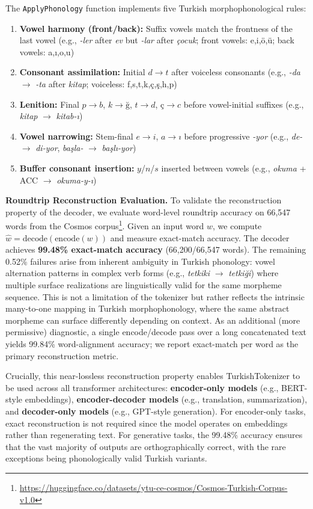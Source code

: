 The \texttt{ApplyPhonology} function implements five Turkish morphophonological rules:

\begin{enumerate}
    \item \textbf{Vowel harmony (front/back):} Suffix vowels match the frontness of the last vowel (e.g., \textit{-ler} after \textit{ev} but \textit{-lar} after \textit{çocuk}; front vowels: e,i,ö,ü; back vowels: a,ı,o,u)
    \item \textbf{Consonant assimilation:} Initial $d \to t$ after voiceless consonants (e.g., \textit{-da} $\to$ \textit{-ta} after \textit{kitap}; voiceless: f,s,t,k,ç,ş,h,p)
    \item \textbf{Lenition:} Final $p \to b$, $k \to ğ$, $t \to d$, $ç \to c$ before vowel-initial suffixes (e.g., \textit{kitap} $\to$ \textit{kitab-ı})
    \item \textbf{Vowel narrowing:} Stem-final $e \to i$, $a \to ı$ before progressive \textit{-yor} (e.g., \textit{de-} $\to$ \textit{di-yor}, \textit{başla-} $\to$ \textit{başlı-yor})
    \item \textbf{Buffer consonant insertion:} $y$/$n$/$s$ inserted between vowels (e.g., \textit{okuma} + ACC $\to$ \textit{okuma-y-ı})
\end{enumerate}

\textbf{Roundtrip Reconstruction Evaluation.} To validate the reconstruction property of the decoder, we evaluate word-level roundtrip accuracy on 66,547 words from the Cosmos corpus\footnote{\url{https://huggingface.co/datasets/ytu-ce-cosmos/Cosmos-Turkish-Corpus-v1.0}}. Given an input word $w$, we compute $\hat{w} = \text{decode}(\text{encode}(w))$ and measure exact-match accuracy. The decoder achieves \textbf{99.48\% exact-match accuracy} (66,200/66,547 words). The remaining 0.52\% failures arise from inherent ambiguity in Turkish phonology: vowel alternation patterns in complex verb forms (e.g., \textit{tetkiki} $\to$ \textit{tetkiği}) where multiple surface realizations are linguistically valid for the same morpheme sequence. This is not a limitation of the tokenizer but rather reflects the intrinsic many-to-one mapping in Turkish morphophonology, where the same abstract morpheme can surface differently depending on context. As an additional (more permissive) diagnostic, a single encode/decode pass over a long concatenated text yields 99.84\% word-alignment accuracy; we report exact-match per word as the primary reconstruction metric.

Crucially, this near-lossless reconstruction property enables TurkishTokenizer to be used across all transformer architectures: \textbf{encoder-only models} (e.g., BERT-style embeddings), \textbf{encoder-decoder models} (e.g., translation, summarization), and \textbf{decoder-only models} (e.g., GPT-style generation). For encoder-only tasks, exact reconstruction is not required since the model operates on embeddings rather than regenerating text. For generative tasks, the 99.48\% accuracy ensures that the vast majority of outputs are orthographically correct, with the rare exceptions being phonologically valid Turkish variants.

